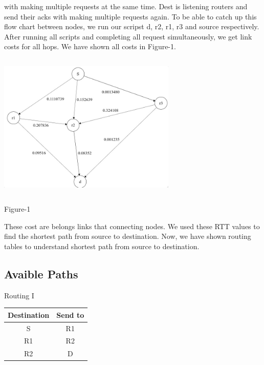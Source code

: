 \documentclass[letterpaper, 12 pt, conference]{ieeeconf}  %
\begin{document}
with making multiple requests at the same time. Dest is listening routers and send their acks with making multiple requests again. To be able to catch up this flow chart between nodes, we run our scripst d, r2, r1, r3 and source respectively. After running all scripts and completing all request simultaneously, we get link costs for all hops. We have shown all costs in Figure-1.


\includegraphics[width=8.5cm, height=7cm]{link-cost.jpeg}

\begin{center}
Figure-1
\end{center}

These cost are belongs links that connecting nodes. We used these RTT values to find the shortest path from source to destination. Now, we have shown routing tables to understand shortest path from source to destination.\\

\subsection{ Avaible Paths }

\begin{center}
Routing I
\end{center}

\begin{center}
 \begin{tabular}{||c c||} 
 \hline
 Destination & Send to  \\ [0.25ex] 
 \hline\hline
 S & R1  \\ 
 \hline
 R1 & R2  \\
 \hline
 R2 & D \\
 
 \hline
\end{tabular}
\end{center}
\end{document}
